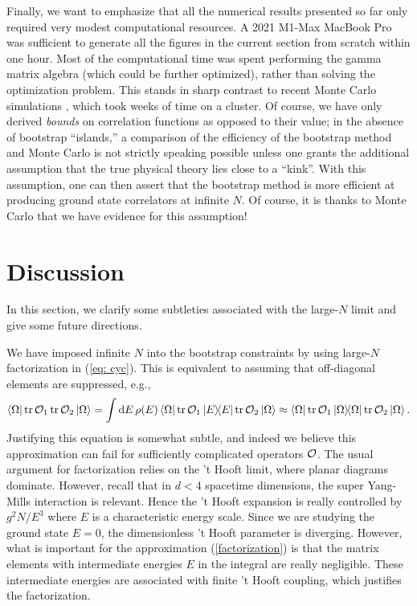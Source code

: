\documentclass[11pt]{article}
\def\la{\label}
\def\nref#1{(\ref{#1})}
\newcommand*\diff{\mathop{}\!\mathrm{d}}
\begin{document}
Finally, we want to emphasize that all the numerical results presented so far only required very modest computational resources. A 2021 M1-Max MacBook Pro was sufficient to generate all the figures in the current section from scratch within one hour. Most of the computational time was spent performing the gamma matrix algebra (which could be further optimized), rather than solving the optimization problem. This stands in sharp contrast to recent Monte Carlo simulations \cite{Pateloudis:2022ijr}, which took weeks of time on a cluster. Of course, we have only derived {\it bounds} on correlation functions as opposed to their value; in the absence of bootstrap ``islands,'' a comparison of the efficiency of the bootstrap method and Monte Carlo is not strictly speaking possible unless one grants the additional assumption that the true physical theory lies close to a ``kink''. With this assumption, one can then assert that the bootstrap method is more efficient at producing ground state correlators at infinite $N$. Of course, it is thanks to Monte Carlo  that we have evidence for this assumption! %




\section{Discussion \label{sec: discuss}}


In this section, we clarify some subtleties associated with the large-$N$ limit and give some future directions.

We have imposed infinite $N$ into the bootstrap constraints by using large-$N$ factorization in \nref{eq: cyc}. This is equivalent to assuming that off-diagonal elements are suppressed, e.g., 
\begin{align}\la{factorization}
\bra{\Omega}\tr \O_1 \tr \O_2\ket{\Omega} = \int \diff{E} \, \rho(E) \bra{\Omega}\tr \O_1 \ketbra{E} \tr \O_2\ket{\Omega}  \approx  \bra{\Omega}\tr \O_1 \ketbra{\Omega} \tr \O_2\ket{\Omega}. 
\end{align}
Justifying this equation is somewhat subtle, and indeed we believe this approximation can fail for sufficiently complicated operators $\mathcal{O}$. 
The usual argument for factorization relies on the 't Hooft limit, where planar diagrams dominate. However, recall that in $d <4$ spacetime dimensions, the super Yang-Mills interaction is relevant. Hence the 't Hooft expansion is really controlled by $g^2 N/E^3$ where $E$ is a characteristic energy scale. Since we are studying the ground state $E=0$, the dimensionless 't Hooft parameter is diverging. However, what is important for the approximation \nref{factorization} is that the matrix elements with intermediate energies $E$ in the integral are really negligible. 
These intermediate energies are associated with finite 't Hooft coupling, which justifies the factorization.
\end{document}
